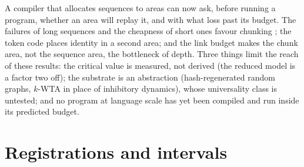 \documentclass[11pt]{article}
\theoremstyle{definition}
\theoremstyle{plain}
\begin{document}
A compiler that allocates sequences to areas can now ask, before running a
program, whether an area will replay it, and with what loss past its budget.
The failures of long sequences and the cheapness of short ones favour
chunking \citep{miller1956magical}; the token code places identity in a second
area; and the link budget makes the chunk area, not the sequence area, the
bottleneck of depth. Three things limit the reach of these results: the
critical value is measured, not derived (the reduced model is a factor two off);
the substrate is an abstraction (hash-regenerated random graphs, $k$-WTA in
place of inhibitory dynamics), whose universality class is untested; and no
program at language scale has yet been compiled and run inside its predicted
budget.

\appendix
\section{Registrations and intervals}
\end{document}
